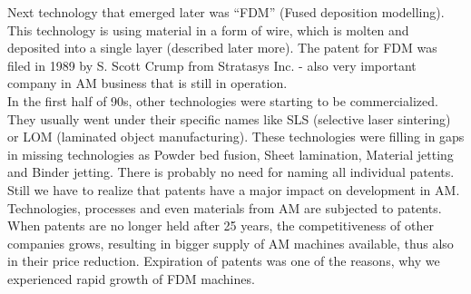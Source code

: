 \documentclass[a4paper]{report}
\begin{document}
Next technology that emerged later was “FDM” (Fused deposition modelling). This technology is using material in a form of wire, which is molten and deposited into a single layer (described later more). The patent for FDM was filed in 1989 by S. Scott Crump from Stratasys Inc.  - also very important company in AM business that is still in operation.\\
In the first half of 90s, other technologies were starting to be commercialized. They usually went under their specific names like SLS (selective laser sintering) or  LOM (laminated object manufacturing). These technologies were filling in gaps in missing technologies as Powder bed fusion, Sheet lamination, Material jetting and Binder jetting. There is probably no need for naming all individual patents. Still we have to realize that patents have a major impact on development in AM. Technologies, processes and even materials from AM are subjected to patents. When patents are no longer held after 25 years, the competitiveness of other companies grows, resulting in bigger supply of AM machines available, thus also in their price reduction. Expiration of patents was one of the reasons, why we experienced rapid growth of FDM machines.
\end{document}

